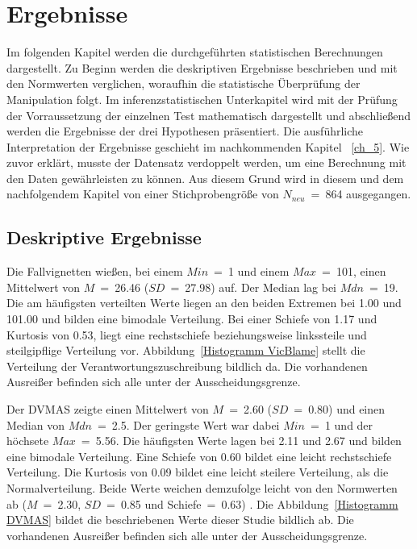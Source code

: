 \chapter{Ergebnisse}   \label{ch_4}
Im folgenden Kapitel werden die durchgeführten statistischen Berechnungen dargestellt. Zu Beginn werden die deskriptiven Ergebnisse beschrieben und mit den Normwerten verglichen, woraufhin die statistische Überprüfung der Manipulation folgt. Im inferenzstatistischen Unterkapitel wird mit der Prüfung der Vorraussetzung der einzelnen Test mathematisch dargestellt und abschließend werden die Ergebnisse der drei Hypothesen präsentiert. Die ausführliche Interpretation der Ergebnisse geschieht im nachkommenden Kapitel ~\ref{ch_5}. 
Wie zuvor erklärt, musste der Datensatz verdoppelt werden, um eine Berechnung mit den Daten gewährleisten zu können. Aus diesem Grund wird in diesem und dem nachfolgendem Kapitel von einer Stichprobengröße von $N_{neu}$~=~864 ausgegangen.

\section{Deskriptive Ergebnisse}    \label{sec_4.1}
Die Fallvignetten wießen, bei einem $Min$~=~1 und einem $Max$~=~101, einen Mittelwert von $M$~=~26.46 ($SD$~=~27.98) auf. Der Median lag bei $Mdn$~=~19. Die am häufigsten verteilten Werte liegen an den beiden Extremen bei 1.00 und 101.00 und bilden eine bimodale Verteilung. Bei einer Schiefe von 1.17 und Kurtosis von 0.53, liegt eine rechstschiefe beziehungsweise linkssteile und steilgipflige Verteilung vor. Abbildung~\ref{Histogramm VicBlame} stellt die Verteilung der Verantwortungszuschreibung bildlich da. Die vorhandenen Ausreißer befinden sich alle unter der Ausscheidungsgrenze.


Der DVMAS zeigte einen Mittelwert von $M$~=~2.60 ($SD$~=~0.80) und einen Median von $Mdn$~=~2.5. Der geringste Wert war dabei $Min$~=~1 und der höchsete $Max$~=~5.56. Die häufigsten Werte lagen bei 2.11 und 2.67 und bilden eine bimodale Verteilung. Eine Schiefe von 0.60 bildet eine leicht rechstschiefe Verteilung. Die Kurtosis von 0.09 bildet eine leicht steilere Verteilung, als die Normalverteilung. Beide Werte weichen demzufolge leicht von den Normwerten ab ($M$~=~2.30, $SD$~=~0.85 und Schiefe~=~0.63) \parencite{DVMAS_Peters}. 
Die Abbildung~\ref{Histogramm DVMAS} bildet die beschriebenen Werte dieser Studie bildlich ab. Die vorhandenen Ausreißer befinden sich alle unter der Ausscheidungsgrenze.


